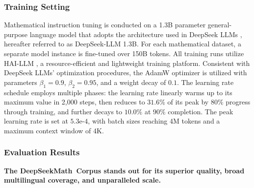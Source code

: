 \subsubsection{Training Setting}
\label{sec:quality-policy}
Mathematical instruction tuning is conducted on a 1.3B parameter general-purpose language model that adopts the architecture used in DeepSeek LLMs \citep{deepseek-llm}, hereafter referred to as DeepSeek-LLM 1.3B. For each mathematical dataset, a separate model instance is fine-tuned over 150B tokens. All training runs utilize HAI-LLM \citep{haillm}, a resource-efficient and lightweight training platform. Consistent with DeepSeek LLMs' optimization procedures, the AdamW optimizer \citep{adamW} is utilized with parameters $\beta_1=0.9$, $\beta_2=0.95$, and a weight decay of $0.1$. The learning rate schedule employs multiple phases: the learning rate linearly warms up to its maximum value in 2,000 steps, then reduces to $31.6\%$ of its peak by $80\%$ progress through training, and further decays to $10.0\%$ at $90\%$ completion. The peak learning rate is set at $5.3\text{e-}4$, with batch sizes reaching 4M tokens and a maximum context window of 4K.

\subsubsection{Evaluation Results}

\textbf{The DeepSeekMath~Corpus stands out for its superior quality, broad multilingual coverage, and unparalleled scale.}

